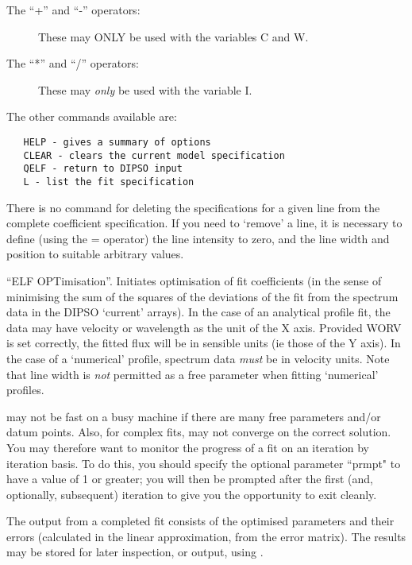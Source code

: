 \begin {description}
\begin{description}
\item [The ``+'' and ``-'' operators:]

These may ONLY be used with the variables C and W.

\item [The ``*'' and ``/'' operators:]

These may {\em only} be used with the variable I.

\end{description}

The other commands available are:

\begin{verbatim}
   HELP - gives a summary of options
   CLEAR - clears the current model specification
   QELF - return to DIPSO input
   L - list the fit specification
\end{verbatim}

There is no command for deleting the specifications for a given line
from the complete coefficient specification. If you need to `remove' a
line, it is necessary to define (using the = operator) the line
intensity to zero, and the line width and position to suitable
arbitrary values.

``ELF OPTimisation''. Initiates optimisation of fit coefficients (in
the sense of minimising the sum of the squares of the deviations of
the fit from the spectrum data in the DIPSO `current' arrays). In the
case of an analytical profile fit, the data may have velocity or
wavelength as the unit of the X axis. Provided WORV is set correctly,
the fitted flux will be in sensible units (ie those of the Y axis). In
the case of a `numerical' profile, spectrum data {\em must} be in
velocity units. Note that line width is {\em not} permitted as a free
parameter when fitting `numerical' profiles.

  may not be fast on a busy machine if there are many free
parameters and/or datum points. Also, for complex fits,   may not
converge on the correct solution. You may therefore want to monitor
the progress of a fit on an iteration by iteration basis. To do this,
you should specify the optional parameter ``prmpt" to have a value of
1 or greater; you will then be prompted after the first (and,
optionally, subsequent) iteration to give you the opportunity to exit
  cleanly.

The output from a completed fit consists of the optimised parameters
and their errors (calculated in the linear approximation, from the
error matrix). The results may be stored for later inspection, or
output, using . 


\end{description}
